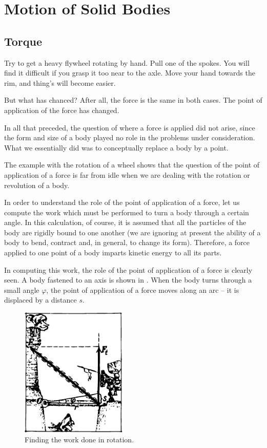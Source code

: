 

\cleardoublepage
\chapter{Motion of Solid Bodies}
\section{Torque}
Try to get a heavy flywheel rotating by hand. Pull
one of the spokes. You will find it difficult if you grasp
it too near to the axle. Move your hand towards the rim,
and thing's will become easier.

But what has chanced? After all, the force is the same
in both cases. The point of application of the force has
changed.

In all that preceded, the question of where a force is
applied did not arise, since the form and size of a body
played no role in the problems under consideration. What
we essentially did was to conceptually replace a body by
a point.

The example with the rotation of a wheel shows that
the question of the point of application of a force is far
from idle when we are dealing with the rotation or revolution of a body.

In order to understand the role of the point of application of a force, let us compute the work which must be
performed to turn a body through a certain angle. In
this calculation, of course, it is assumed that all the particles of the body are rigidly bound to one another (we
are ignoring at present the ability of a body to bend, contract and, in general, to change its form). Therefore, a
force applied to one point of a body imparts kinetic energy to all its parts.

In computing this work, the role of the point of application of a force is clearly seen. A body fastened to an axis is shown in . When the body turns through a small angle $\varphi$, the point of application of a force moves along an arc -- it is displaced by a distance $s$.

 \begin{figure}[!ht]
 \centering
 \includegraphics[width=0.45\textwidth]{figures/fig-5-01.pdf}
 \caption{Finding the work done in rotation.}
 \label{fig-5-01}
 \end{figure}

